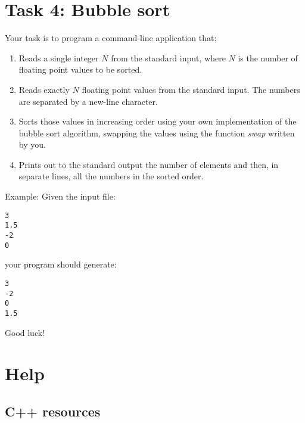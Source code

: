 \section*{Task 4: Bubble sort}

Your task is to program a command-line application that:
\begin{enumerate}
	\item Reads a single integer $N$ from the standard input, where $N$ is the number of floating point values to be sorted. 
	\item Reads exactly $N$ floating point values from the standard input. The numbers are separated by a new-line character.
	\item Sorts those values in increasing order using your own implementation of the bubble sort algorithm, swapping the values using the function \emph{swap} written by you. 
	\item Prints out to the standard output the number of elements and then, in separate lines, all the numbers in the sorted order.
\end{enumerate}


Example: Given the input file:
\begin{verbatim}
3
1.5
-2
0
\end{verbatim}
your program should generate:
\begin{verbatim}
3
-2
0
1.5
\end{verbatim}


Good luck!

\section{Help}


\subsection{C++ resources}

